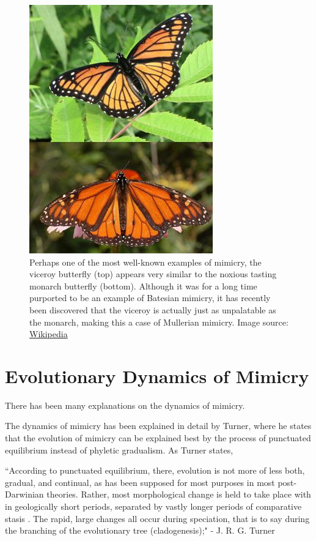 \begin{figure}[H]
	\centering
	\includegraphics[scale=0.75]{images/BatesMimButter}
	\caption{Perhaps one of the most well-known examples of mimicry, the viceroy butterfly (top) appears very similar to the noxious tasting monarch butterfly (bottom). Although it was for a long time purported to be an example of Batesian mimicry, it has recently been discovered that the viceroy is actually just as unpalatable as the monarch, making this a case of Mullerian mimicry. \cite{brower1991} Image source: \href{http://en.wikipedia.org/wiki/Mullerian_mimicry}{Wikipedia}}
	\label{fig:mullerian-butterfly}
\end{figure}

\section{Evolutionary Dynamics of Mimicry}
There has been many explanations on the dynamics of mimicry. 


The dynamics of mimicry has been explained in detail by Turner, where he states that the evolution of mimicry can be explained best by the process of punctuated equilibrium instead of phyletic gradualism. As Turner states,

``According to punctuated equilibrium, there, evolution is not more of less both, gradual, and continual, as has been supposed for most purposes in most post-Darwinian theories. Rather, most morphological change is held to take place with in geologically short periods, separated by vastly longer periods of comparative stasis \cite{eldredge1972}. The rapid, large changes all occur during speciation, that is to say during the branching of the evolutionary tree (cladogenesis);" - J. R. G. Turner \cite{turner1988}

